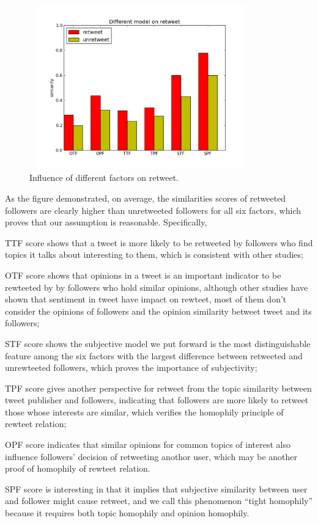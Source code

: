 \documentclass[preprint]{elsarticle}
\begin{document}
\begin{figure}[htb]
\setlength{\belowcaptionskip}{-0.2cm} 
\centering
\includegraphics[width=3.8in,height=2.8in]{component.pdf}
\vspace{-4em}\caption{Influence of different factors on retweet.}
\label{fig:graph6}
\end{figure}
As the figure demonstrated, on average, the similarities scores of retweeted followers are clearly higher than unretweeted followers for all six factors, which proves that our assumption is reasonable. Specifically,
\begin{itemize*}
\item TTF score shows that a tweet is more likely to be retweeted by followers who find topics it talks about interesting to them, which is consistent with other studies\cite{conf/icwsm/MacskassyM11, conf/wsdm/FengW13};
\item OTF score shows that opinions in a tweet is an important indicator to be rewteeted by by followers who hold similar opinions, although other studies\cite{conf/icwsm/PfitznerGS12,2011:NaveedGKC} have shown that sentiment in tweet have impact on rewteet, most of them don't consider the opinions of followers and the opinion similarity betweet tweet and its followers;
\item STF score shows the subjective model we put forward is the most distinguishable feature among the six factors with the largest difference between retweeted and unrewteeted followers, which proves the importance of subjectivity;
\item TPF score gives another perspective for retweet from the topic similarity between tweet publisher and followers, indicating that followers are more likely to retweet those whose interests are similar, which verifies the homophily principle of rewteet relation;
\item OPF score indicates that similar opinions for common topics of interest also influence followers' decision of retweeting anothor user, which may be another proof of homophily of rewteet relation.
\item SPF score is interesting in that it implies that subjective similarity between user and follower might cause retweet, and we call this phenomenon ``tight homophily'' because it requires both topic homophily and opinion homophily.
\end{itemize*} 
\end{document}

